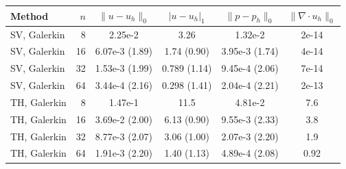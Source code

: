 \begin{tabular}{lrcccc}
\toprule
Method & $n$ & $\|u-u_h\|_0$ & $|u-u_h|_1$ & $\|p-p_h\|_0$ & $\|\nabla\cdot u_h\|_0$ \\
\midrule
SV, Galerkin & 8 & 2.25e-2 & 3.26 & 1.32e-2 & 2e-14 \\
SV, Galerkin & 16 & 6.07e-3 (1.89) & 1.74 (0.90) & 3.95e-3 (1.74) & 4e-14 \\
SV, Galerkin & 32 & 1.53e-3 (1.99) & 0.789 (1.14) & 9.45e-4 (2.06) & 7e-14 \\
SV, Galerkin & 64 & 3.44e-4 (2.16) & 0.298 (1.41) & 2.04e-4 (2.21) & 2e-13 \\
\midrule
TH, Galerkin & 8 & 1.47e-1 & 11.5 & 4.81e-2 & 7.6 \\
TH, Galerkin & 16 & 3.69e-2 (2.00) & 6.13 (0.90) & 9.55e-3 (2.33) & 3.8 \\
TH, Galerkin & 32 & 8.77e-3 (2.07) & 3.06 (1.00) & 2.07e-3 (2.20) & 1.9 \\
TH, Galerkin & 64 & 1.91e-3 (2.20) & 1.40 (1.13) & 4.89e-4 (2.08) & 0.92 \\
\bottomrule
\end{tabular}
